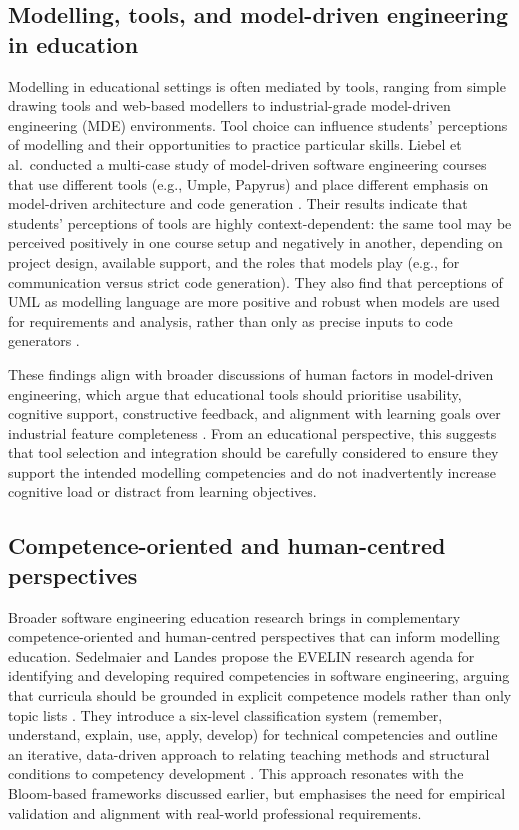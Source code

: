 \subsection{Modelling, tools, and model-driven engineering in education}
\label{subsec:tools_mde_education}

Modelling in educational settings is often mediated by tools, ranging from simple drawing tools and web-based modellers to industrial-grade model-driven engineering (MDE) environments. Tool choice can influence students' perceptions of modelling and their opportunities to practice particular skills. Liebel et al.\ conducted a multi-case study of model-driven software engineering courses that use different tools (e.g., Umple, Papyrus) and place different emphasis on model-driven architecture and code generation \cite{liebel2017model}. Their results indicate that students' perceptions of tools are highly context-dependent: the same tool may be perceived positively in one course setup and negatively in another, depending on project design, available support, and the roles that models play (e.g., for communication versus strict code generation). They also find that perceptions of UML as modelling language are more positive and robust when models are used for requirements and analysis, rather than only as precise inputs to code generators \cite{liebel2017model}.

These findings align with broader discussions of human factors in model-driven engineering, which argue that educational tools should prioritise usability, cognitive support, constructive feedback, and alignment with learning goals over industrial feature completeness \cite{human-factors-mde}. From an educational perspective, this suggests that tool selection and integration should be carefully considered to ensure they support the intended modelling competencies and do not inadvertently increase cognitive load or distract from learning objectives.

\subsection{Competence-oriented and human-centred perspectives}
\label{subsec:competence_human_centre}

Broader software engineering education research brings in complementary competence-oriented and human-centred perspectives that can inform modelling education. Sedelmaier and Landes propose the EVELIN research agenda for identifying and developing required competencies in software engineering, arguing that curricula should be grounded in explicit competence models rather than only topic lists \cite{sedelmaier2013research}. They introduce a six-level classification system (remember, understand, explain, use, apply, develop) for technical competencies and outline an iterative, data-driven approach to relating teaching methods and structural conditions to competency development \cite{sedelmaier2013research}. This approach resonates with the Bloom-based frameworks discussed earlier, but emphasises the need for empirical validation and alignment with real-world professional requirements.

